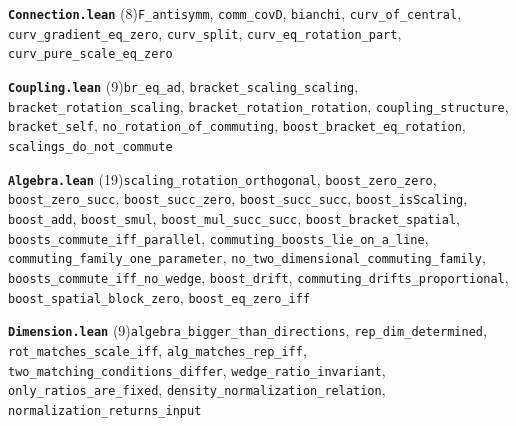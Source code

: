 \documentclass[11pt,a4paper]{article}
\theoremstyle{sudef}
\begin{document}
\noindent\textbf{\texttt{Connection.lean}} (8)\quad \texttt{F\_\allowbreak antisymm}, \texttt{comm\_\allowbreak covD}, \texttt{bianchi}, \texttt{curv\_\allowbreak of\_\allowbreak central}, \texttt{curv\_\allowbreak gradient\_\allowbreak eq\_\allowbreak zero}, \texttt{curv\_\allowbreak split}, \texttt{curv\_\allowbreak eq\_\allowbreak rotation\_\allowbreak part}, \texttt{curv\_\allowbreak pure\_\allowbreak scale\_\allowbreak eq\_\allowbreak zero}\par\smallskip
\noindent\textbf{\texttt{Coupling.lean}} (9)\quad \texttt{br\_\allowbreak eq\_\allowbreak ad}, \texttt{bracket\_\allowbreak scaling\_\allowbreak scaling}, \texttt{bracket\_\allowbreak rotation\_\allowbreak scaling}, \texttt{bracket\_\allowbreak rotation\_\allowbreak rotation}, \texttt{coupling\_\allowbreak structure}, \texttt{bracket\_\allowbreak self}, \texttt{no\_\allowbreak rotation\_\allowbreak of\_\allowbreak commuting}, \texttt{boost\_\allowbreak bracket\_\allowbreak eq\_\allowbreak rotation}, \texttt{scalings\_\allowbreak do\_\allowbreak not\_\allowbreak commute}\par\smallskip
\noindent\textbf{\texttt{Algebra.lean}} (19)\quad \texttt{scaling\_\allowbreak rotation\_\allowbreak orthogonal}, \texttt{boost\_\allowbreak zero\_\allowbreak zero}, \texttt{boost\_\allowbreak zero\_\allowbreak succ}, \texttt{boost\_\allowbreak succ\_\allowbreak zero}, \texttt{boost\_\allowbreak succ\_\allowbreak succ}, \texttt{boost\_\allowbreak isScaling}, \texttt{boost\_\allowbreak add}, \texttt{boost\_\allowbreak smul}, \texttt{boost\_\allowbreak mul\_\allowbreak succ\_\allowbreak succ}, \texttt{boost\_\allowbreak bracket\_\allowbreak spatial}, \texttt{boosts\_\allowbreak commute\_\allowbreak iff\_\allowbreak parallel}, \texttt{commuting\_\allowbreak boosts\_\allowbreak lie\_\allowbreak on\_\allowbreak a\_\allowbreak line}, \texttt{commuting\_\allowbreak family\_\allowbreak one\_\allowbreak parameter}, \texttt{no\_\allowbreak two\_\allowbreak dimensional\_\allowbreak commuting\_\allowbreak family}, \texttt{boosts\_\allowbreak commute\_\allowbreak iff\_\allowbreak no\_\allowbreak wedge}, \texttt{boost\_\allowbreak drift}, \texttt{commuting\_\allowbreak drifts\_\allowbreak proportional}, \texttt{boost\_\allowbreak spatial\_\allowbreak block\_\allowbreak zero}, \texttt{boost\_\allowbreak eq\_\allowbreak zero\_\allowbreak iff}\par\smallskip
\noindent\textbf{\texttt{Dimension.lean}} (9)\quad \texttt{algebra\_\allowbreak bigger\_\allowbreak than\_\allowbreak directions}, \texttt{rep\_\allowbreak dim\_\allowbreak determined}, \texttt{rot\_\allowbreak matches\_\allowbreak scale\_\allowbreak iff}, \texttt{alg\_\allowbreak matches\_\allowbreak rep\_\allowbreak iff}, \texttt{two\_\allowbreak matching\_\allowbreak conditions\_\allowbreak differ}, \texttt{wedge\_\allowbreak ratio\_\allowbreak invariant}, \texttt{only\_\allowbreak ratios\_\allowbreak are\_\allowbreak fixed}, \texttt{density\_\allowbreak normalization\_\allowbreak relation}, \texttt{normalization\_\allowbreak returns\_\allowbreak input}\par\smallskip
\end{document}
